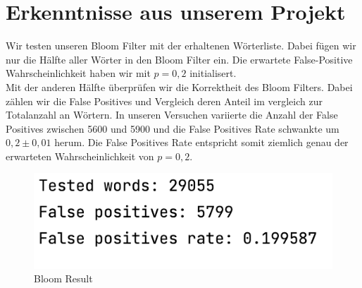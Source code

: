 \documentclass{article}
\begin{document}
    \clearpage


    \section{Erkenntnisse aus unserem Projekt}
    Wir testen unseren Bloom Filter mit der erhaltenen Wörterliste. Dabei fügen wir nur die Hälfte aller Wörter in den Bloom Filter ein. Die erwartete False-Positive Wahrscheinlichkeit haben wir mit $p = 0,2$ initialisert.
    \\
    Mit der anderen Hälfte überprüfen wir die Korrektheit des Bloom Filters. Dabei zählen wir die False Positives und Vergleich deren Anteil im vergleich zur Totalanzahl an Wörtern. In unseren Versuchen variierte die Anzahl der False Positives zwischen 5600 und 5900 und die False Positives Rate schwankte um $0,2 \pm 0,01$ herum. Die False Positives Rate entspricht somit ziemlich genau der erwarteten Wahrscheinlichkeit von $p = 0,2$.
    \begin{figure}[h!]
        \centering
        \includegraphics{./lib/dist_bloomResult.png}
        \caption{Bloom Result}
        \label{fig:Bloom Result}
    \end{figure}
\end{document}
